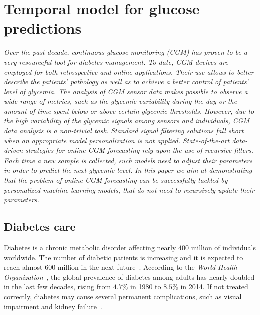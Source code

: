 
\chapter{Temporal model for glucose predictions} \label{chap:diabete}

\begin{displayquote}
\textit{Over the past decade, continuous glucose monitoring (CGM) has proven to be a very resourceful tool for diabetes management. To date, CGM devices are employed for both retrospective and online applications. Their use allows to better describe the patients' pathology as well as to achieve a better control  of  patients' level of glycemia. The analysis of CGM sensor data makes possible to observe a wide range of metrics, such as the glycemic variability during the day or the amount of time spent below or above certain glycemic thresholds. However, due to the high variability of the glycemic signals among sensors and individuals, CGM data analysis is a non-trivial task. Standard signal filtering solutions fall short when an appropriate model personalization is not applied. State-of-the-art data-driven strategies for online CGM forecasting rely upon the use of recursive filters. Each time a new sample is collected, such models need to adjust their parameters in order to predict the next glycemic level. In this paper we aim at demonstrating that the problem of online CGM forecasting can be successfully tackled by personalized machine learning models, that do not need to recursively update their parameters.}
\end{displayquote}

\section{Diabetes care}
Diabetes is a chronic metabolic disorder affecting nearly $400$ million of individuals worldwide. The number of diabetic patients is increasing and it is expected to reach almost $600$ million in the next future~\cite{guariguata2014global}.
According to the {\em World Health Organization}~\cite{world2016global}, the global prevalence of diabetes among adults has nearly doubled in the last few decades, rising from $4.7\%$ in 1980 to $8.5\%$ in 2014.
If not treated correctly, diabetes may cause several permanent complications, such as visual impairment and kidney failure~\cite{world2016global}. 

